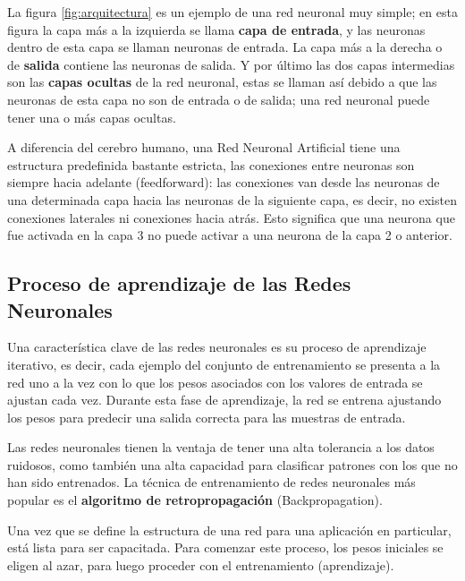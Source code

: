 La figura \ref{fig:arquitectura} es un ejemplo de una red neuronal muy simple; en esta figura la capa m\'{a}s a la izquierda se llama \textbf{capa de entrada}, y las neuronas dentro de esta capa se llaman neuronas de entrada. La capa m\'{a}s a la derecha o de \textbf{salida} contiene las neuronas de salida. Y por \'{u}ltimo las dos capas intermedias son las \textbf{capas ocultas} de la red neuronal, estas se llaman as\'{i} debido a que las neuronas de esta capa no son de entrada o de salida; una red neuronal puede tener una o m\'{a}s capas ocultas.

\vspace{5mm} %

A diferencia del cerebro humano, una Red Neuronal Artificial tiene una estructura predefinida bastante estricta, las conexiones entre neuronas son siempre hacia adelante (feedforward): las conexiones van desde las neuronas de una determinada capa hacia las neuronas de la siguiente capa, es decir, no existen conexiones laterales ni conexiones hacia atr\'{a}s. Esto significa que una neurona que fue activada en la capa 3 no puede activar a una neurona de la capa 2 o anterior.

\subsection{Proceso de aprendizaje de las Redes Neuronales}

Una caracter\'{i}stica clave de las  redes neuronales es su proceso de aprendizaje iterativo, es decir, cada ejemplo del conjunto de entrenamiento se presenta a la red uno a la vez con lo que los pesos asociados con los valores de entrada se ajustan cada vez. Durante esta fase de aprendizaje, la red se entrena ajustando los pesos para predecir una salida correcta para las muestras de entrada.

\vspace{5mm} %

Las redes neuronales tienen la ventaja de tener una alta tolerancia a los datos ruidosos, como tambi\'{e}n una alta capacidad para clasificar patrones con los que no han sido entrenados. La t\'{e}cnica de entrenamiento de redes neuronales m\'{a}s popular es el \textbf{algoritmo de retropropagaci\'{o}n} (Backpropagation). 

\vspace{5mm} %

Una vez que se define la estructura de una red para una aplicaci\'{o}n en particular, est\'{a} lista para ser capacitada. Para comenzar este proceso, los pesos iniciales se eligen al azar, para luego proceder con el entrenamiento (aprendizaje). 


